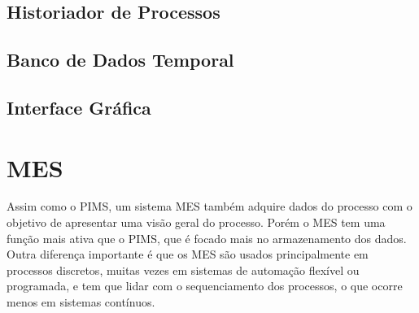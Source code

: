\subsection{Historiador de Processos}

\subsection{Banco de Dados Temporal}

\subsection{Interface Gráfica}

\section{MES}
Assim como o PIMS, um sistema MES também adquire dados do processo com o objetivo de apresentar uma visão geral do processo. Porém o MES tem uma função mais ativa que o PIMS, que é focado mais no armazenamento dos dados. Outra diferença importante é que os MES são usados principalmente em processos discretos, muitas vezes em sistemas de automação flexível ou programada, e tem que lidar com o sequenciamento dos processos, o que ocorre menos em sistemas contínuos.

